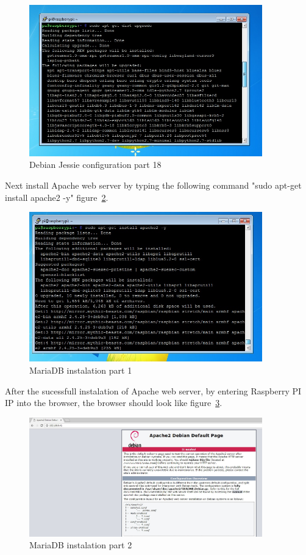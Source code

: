 \documentclass[12pt,]{article}
\begin{document}
\begin{figure}[H]
  	\begin{center}
    	\includegraphics[width=0.9\textwidth]{Ras_17}
  	\end{center}
  	\caption{Debian Jessie configuration part 18}
	\label{fig:35}
\end{figure}
Next install Apache web server by typing the following command "sudo apt-get install apache2 -y" figure~\ref{fig:36}.
\begin{figure}[H]
  	\begin{center}
    	\includegraphics[width=0.9\textwidth]{Ras_18}
  	\end{center}
  	\caption{MariaDB instalation part 1}
	\label{fig:36}
\end{figure}
After the sucessfull instalation of Apache web server, by entering Raspberry PI IP into the browser, the browser should look like figure~\ref{fig:37}.
\begin{figure}[H]
  	\begin{center}
    	\includegraphics[width=0.9\textwidth]{Ras_19}
  	\end{center}
  	\caption{MariaDB instalation part 2}
	\label{fig:37}
\end{figure}
\end{document}
